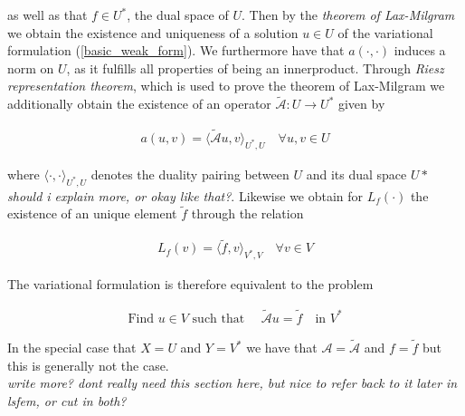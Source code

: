 \documentclass[../draft_1.tex]{subfiles}
\begin{document}
as well as that $f \in U^*$, the dual space of $U$. Then by the \textit{theorem of Lax-Milgram} we obtain the existence and uniqueness of a solution $u \in U$ of the variational formulation (\ref{basic_weak_form}). We furthermore have that $a(\cdot, \cdot)$ induces a norm on $U$, as it fulfills all properties of being an innerproduct. Through \textit{Riesz representation theorem}, which is used to prove the theorem of Lax-Milgram we additionally obtain the existence of an operator $\tilde{\mathcal{A}} : U \rightarrow U^*$ given by
\begin{ceqn}
\begin{align}
a(u,v) = \langle \tilde{\mathcal{A}} u, v \rangle_{U^*, U} \quad \forall u, v \in U
\end{align}
\end{ceqn}
where $\langle \cdot, \cdot \rangle_{U^*, U}$ denotes the duality pairing between $U$ and its dual space $U*$ \textit{should i explain more, or okay like that?}. Likewise we obtain for $L_f(\cdot)$ the existence of an unique element $\tilde{f}$ through the relation
\begin{ceqn}
\begin{align}
L_f(v) = \langle \tilde{f}, v \rangle_{V^*, V} \quad \forall v \in V
\end{align} 
\end{ceqn}
The variational formulation is therefore equivalent to the problem 
\begin{ceqn}
\begin{align}
\text{Find } u \in V \text{ such that } \quad \tilde{\mathcal{A}} u = \tilde{f} \quad  \text{in } V^*
\end{align}
\end{ceqn}
In the special case that $X = U$ and $Y = V^*$ we have that $ \mathcal{A} = \tilde{\mathcal{A}}$ and $ f = \tilde{f}$ but this is generally not the case. \\
\textit{write more? dont really need this section here, but nice to refer back to it later in lsfem, or cut in both?} 
\end{document}
